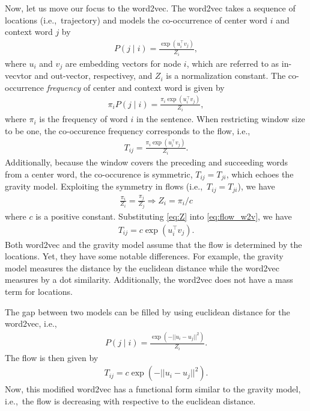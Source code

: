 \documentclass[12pt]{article} %
\def\given{\mid}
\def\ie{i.e.,~}
\begin{document}
Now, let us move our focus to the word2vec.
The word2vec takes a sequence of locations (\ie trajectory) and models the co-occurrence of center word $i$ and context word $j$ by
\begin{align}
    P(j\given i) = \frac{\exp(u_i ^\top v_j)}{Z_i},
\end{align}
where $u_i$ and $v_{j}$ are embedding vectors for node $i$, which are referred to as in-vecvtor and out-vector, respectivey, and $Z_i$ is a normalization constant.
The co-occurrence \emph{frequency} of center and context word is given by
\begin{align}
    \pi_i P(j\given i) = \frac{\pi_i\exp(u_i ^\top v_j)}{Z_i},
\end{align}
where $\pi_i$ is the frequency of word $i$ in the sentence. When restricting window size to be one, the co-occurence frequency corresponds to the flow, \ie
\begin{align}
    T_{ij} = \frac{\pi_i\exp(u_i ^\top v_j)}{Z_i}. \label{eq:flow_w2v}
\end{align}
Additionally, because the window covers the preceding and succeeding words from a center word, the co-occurence is symmetric, $T_{ij} = T_{ji}$, which echoes the gravity model.
Exploiting the symmetry in flows (\ie $T_{ij} = T_{ji}$), we have
\begin{align}
    \frac{\pi_i}{Z_i}  = \frac{\pi_j}{Z_j}
    \Rightarrow Z_i   = \pi_i / c \label{eq:Z}
\end{align}
where $c$ is a positive constant. Substituting \eqref{eq:Z} into \eqref{eq:flow_w2v}, we have
\begin{align}
    T_{ij} = c \exp(u_i ^\top v_j). \label{eq:flow_w2v2}
\end{align}
Both word2vec and the gravity model assume that the flow is determined by the locations.
Yet, they have some notable differences.
For example, the gravity model measures the distance by the euclidean distance while the word2vec measures by a dot similarity.
Additionally, the word2vec does not have a mass term for locations.

The gap between two models can be filled by using euclidean distance for the word2vec, \ie
\begin{align}
    P(j\given i) = \frac{\exp(-||u_i - u_j||^2)}{Z_i}.
\end{align}
The flow is then given by
\begin{align}
    T_{ij} = c \exp(-||u_i - u_j||^2).
\end{align}
Now, this modified word2vec has a functional form similar to the gravity model, \ie the flow is decreasing with respective to the euclidean distance.
\end{document}
